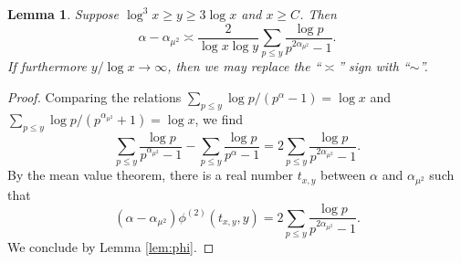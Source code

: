 \documentclass{amsart}
\theoremstyle{plain}
\newtheorem{lem}[thm]{Lemma}
\theoremstyle{remark}
\begin{document}
\begin{lem}\label{lem:alphadiff}
	Suppose $\log^3 x \ge y \ge 3\log x$ and $x \ge C$. Then 
	\[\alpha-\alpha_{\mu^2} \asymp \frac{2}{\log x \log y} \sum_{p \le y} \frac{\log p}{p^{2\alpha_{\mu^2}}-1}.\]
	If furthermore $y/\log x \to \infty$, then we may replace the  ``$\asymp$'' sign with ``$\sim$''.
\end{lem}
\begin{proof}
	Comparing the relations $\sum_{p \le y} \log p/(p^{\alpha}-1)=\log x$ and $\sum_{p \le y} \log p/(p^{\alpha_{\mu^2}}+1)=\log x$, we find
	\[\sum_{p \le y} \frac{\log p}{p^{\alpha_{\mu^2}}-1}- \sum_{p \le y} \frac{\log p}{p^{\alpha}-1}  = 2 \sum_{p \le y} \frac{\log p}{p^{2\alpha_{\mu^2}}-1}.\]
	By the mean value theorem, there is a real number $t_{x,y}$ between $\alpha$ and $\alpha_{\mu^2}$ such that
	\[ (\alpha-\alpha_{\mu^2})\phi^{(2)}(t_{x,y},y)  =2 \sum_{p \le y} \frac{\log p}{p^{2\alpha_{\mu^2}}-1}.\]
	We conclude by Lemma \ref{lem:phi}.
\end{proof}
\end{document}
